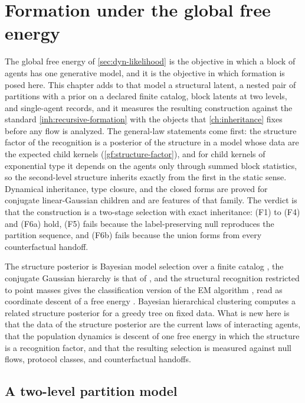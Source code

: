 \chapter{Formation under the global free energy}
\label{ch:global-formation}

The global free energy of \cref{sec:dyn-likelihood} is the objective in which
a block of agents has one generative model, and it is the objective in which
formation is posed here. This chapter adds to that model a structural latent,
a nested pair of partitions with a prior on a declared finite catalog, block
latents at two levels, and single-agent records, and it measures the
resulting construction against the standard \cref{inh:recursive-formation}
with the objects that \cref{ch:inheritance} fixes before any flow is
analyzed. The general-law statements come first: the structure factor of the
recognition is a posterior of the structure in a model whose data are the
expected child kernels (\cref{gf:structure-factor}), and for child kernels of
exponential type it depends on the agents only through summed block
statistics, so the second-level structure inherits exactly from the first in
the static sense. Dynamical inheritance, type closure, and the closed forms
are proved for conjugate linear-Gaussian children and are features of that
family. The verdict is that the construction is a two-stage selection with
exact inheritance: (F1) to (F4) and (F6a) hold, (F5) fails because the
label-preserving null reproduces the partition sequence, and (F6b) fails
because the union forms from every counterfactual handoff.

The structure posterior is Bayesian model selection over a finite catalog
\citep{KassRaftery1995}, the conjugate Gaussian hierarchy is that of
\citet{LindleySmith1972}, and the structural recognition restricted to point
masses gives the classification version of the EM algorithm
\citep{CeleuxGovaert1992,DempsterLairdRubin1977}, read as coordinate descent
of a free energy \citep{NealHinton1998}. Bayesian hierarchical clustering
\citep{HellerGhahramani2005} computes a related structure posterior for a
greedy tree on fixed data. What is new here is that the data of the
structure posterior are the current laws of interacting agents, that the
population dynamics is descent of one free energy in which the structure is
a recognition factor, and that the resulting selection is measured against
null flows, protocol classes, and counterfactual handoffs.

\section{A two-level partition model}
\label{gf:sec-model}

